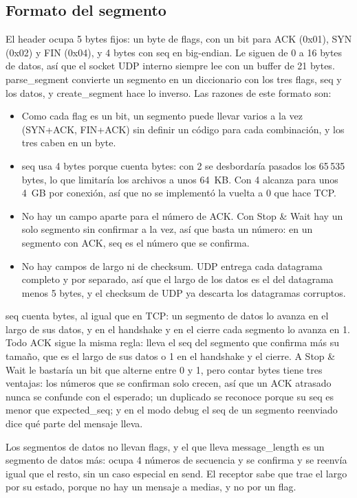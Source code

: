 \documentclass[
	spanish, %
	letterpaper, oneside
]{article}
\newcommand{\code}[1]{#1}     %
\newcommand{\flag}[1]{#1}     %
\newcommand{\field}[1]{#1}    %
\begin{document}
\subsection{Formato del segmento}
El header ocupa 5 bytes fijos: un byte de flags, con un bit para \flag{ACK} (0x01), \flag{SYN}
(0x02) y \flag{FIN} (0x04), y 4 bytes con \field{seq} en big-endian. Le siguen de 0 a 16 bytes
de datos, así que el socket UDP interno siempre lee con un buffer de 21 bytes.
\code{parse\_segment} convierte un segmento en un diccionario con los tres flags, \field{seq} y
los datos, y \code{create\_segment} hace lo inverso. Las razones de este formato son:
\begin{itemize}
	\item Como cada flag es un bit, un segmento puede llevar varios a la vez (\flag{SYN+ACK},
	\flag{FIN+ACK}) sin definir un código para cada combinación, y los tres caben en un byte.
	\item \field{seq} usa 4 bytes porque cuenta bytes: con 2 se desbordaría pasados los 65\,535
	bytes, lo que limitaría los archivos a unos 64~KB. Con 4 alcanza para unos 4~GB por conexión,
	así que no se implementó la vuelta a 0 que hace TCP.
	\item No hay un campo aparte para el número de \flag{ACK}. Con Stop \& Wait hay un solo segmento
	sin confirmar a la vez, así que basta un número: en un segmento con \flag{ACK}, \field{seq} es el
	número que se confirma.
	\item No hay campos de largo ni de checksum. UDP entrega cada datagrama completo y por separado,
	así que el largo de los datos es el del datagrama menos 5 bytes, y el checksum de UDP ya descarta
	los datagramas corruptos.
\end{itemize}

\field{seq} cuenta bytes, al igual que en TCP: un segmento de datos lo avanza en el largo de sus
datos, y en el handshake y en el cierre cada segmento lo avanza en 1. Todo \flag{ACK} sigue la
misma regla: lleva el \field{seq} del segmento que confirma más su tamaño, que es el largo de sus
datos o 1 en el handshake y el cierre. A Stop \& Wait le bastaría un bit que alterne entre 0 y 1,
pero contar bytes tiene tres ventajas: los números que se confirman solo crecen, así que un
\flag{ACK} atrasado nunca se confunde con el esperado; un duplicado se reconoce porque su
\field{seq} es menor que \field{expected\_seq}; y en el modo debug el \field{seq} de un segmento
reenviado dice qué parte del mensaje lleva.

Los segmentos de datos no llevan flags, y el que lleva \field{message\_length} es un segmento de
datos más: ocupa 4 números de secuencia y se confirma y se reenvía igual que el resto, sin un
caso especial en \code{send}. El receptor sabe que trae el largo por su estado, porque no hay un
mensaje a medias, y no por un flag.
\end{document}
